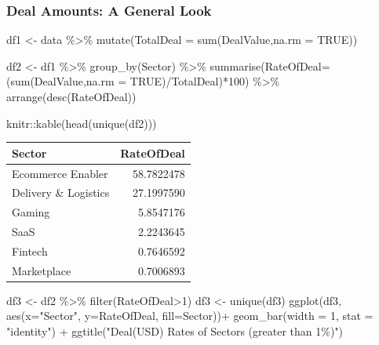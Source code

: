\documentclass[
  letterpaper,
  DIV=11,
  numbers=noendperiod]{scrreprt}
\newenvironment{Shaded}{\begin{snugshade}}{\end{snugshade}}
\newcommand{\AttributeTok}[1]{\textcolor[rgb]{0.40,0.45,0.13}{#1}}
\newcommand{\ConstantTok}[1]{\textcolor[rgb]{0.56,0.35,0.01}{#1}}
\newcommand{\DecValTok}[1]{\textcolor[rgb]{0.68,0.00,0.00}{#1}}
\newcommand{\FunctionTok}[1]{\textcolor[rgb]{0.28,0.35,0.67}{#1}}
\newcommand{\NormalTok}[1]{\textcolor[rgb]{0.00,0.23,0.31}{#1}}
\newcommand{\OtherTok}[1]{\textcolor[rgb]{0.00,0.23,0.31}{#1}}
\newcommand{\SpecialCharTok}[1]{\textcolor[rgb]{0.37,0.37,0.37}{#1}}
\newcommand{\StringTok}[1]{\textcolor[rgb]{0.13,0.47,0.30}{#1}}
\begin{document}
\hypertarget{deal-amounts-a-general-look}{%
\subsubsection{Deal Amounts: A General
Look}\label{deal-amounts-a-general-look}}

\begin{Shaded}
\begin{Highlighting}[]
\NormalTok{df1 }\OtherTok{\textless{}{-}}\NormalTok{  data }\SpecialCharTok{\%\textgreater{}\%}
  \FunctionTok{mutate}\NormalTok{(}\AttributeTok{TotalDeal =} \FunctionTok{sum}\NormalTok{(DealValue,}\AttributeTok{na.rm =} \ConstantTok{TRUE}\NormalTok{))}

 
\NormalTok{df2 }\OtherTok{\textless{}{-}}\NormalTok{ df1 }\SpecialCharTok{\%\textgreater{}\%}
  \FunctionTok{group\_by}\NormalTok{(Sector) }\SpecialCharTok{\%\textgreater{}\%}
  \FunctionTok{summarise}\NormalTok{(}\AttributeTok{RateOfDeal=}\NormalTok{(}\FunctionTok{sum}\NormalTok{(DealValue,}\AttributeTok{na.rm =} \ConstantTok{TRUE}\NormalTok{)}\SpecialCharTok{/}\NormalTok{TotalDeal)}\SpecialCharTok{*}\DecValTok{100}\NormalTok{) }\SpecialCharTok{\%\textgreater{}\%}
  \FunctionTok{arrange}\NormalTok{(}\FunctionTok{desc}\NormalTok{(RateOfDeal)) }
  

\NormalTok{knitr}\SpecialCharTok{::}\FunctionTok{kable}\NormalTok{(}\FunctionTok{head}\NormalTok{(}\FunctionTok{unique}\NormalTok{(df2)))}
\end{Highlighting}
\end{Shaded}

\begin{longtable}[]{@{}lr@{}}
\toprule()
Sector & RateOfDeal \\
\midrule()
\endhead
Ecommerce Enabler & 58.7822478 \\
Delivery \& Logistics & 27.1997590 \\
Gaming & 5.8547176 \\
SaaS & 2.2243645 \\
Fintech & 0.7646592 \\
Marketplace & 0.7006893 \\
\bottomrule()
\end{longtable}

\begin{Shaded}
\begin{Highlighting}[]
\NormalTok{df3 }\OtherTok{\textless{}{-}}\NormalTok{ df2 }\SpecialCharTok{\%\textgreater{}\%} \FunctionTok{filter}\NormalTok{(RateOfDeal}\SpecialCharTok{\textgreater{}}\DecValTok{1}\NormalTok{)}
\NormalTok{df3 }\OtherTok{\textless{}{-}} \FunctionTok{unique}\NormalTok{(df3)}
\FunctionTok{ggplot}\NormalTok{(df3, }\FunctionTok{aes}\NormalTok{(}\AttributeTok{x=}\StringTok{"Sector"}\NormalTok{, }\AttributeTok{y=}\NormalTok{RateOfDeal, }\AttributeTok{fill=}\NormalTok{Sector))}\SpecialCharTok{+}
\FunctionTok{geom\_bar}\NormalTok{(}\AttributeTok{width =} \DecValTok{1}\NormalTok{, }\AttributeTok{stat =} \StringTok{"identity"}\NormalTok{) }\SpecialCharTok{+}
  \FunctionTok{ggtitle}\NormalTok{(}\StringTok{"Deal(USD) Rates of Sectors (greater than 1\%)"}\NormalTok{)}
\end{Highlighting}
\end{Shaded}
\end{document}
